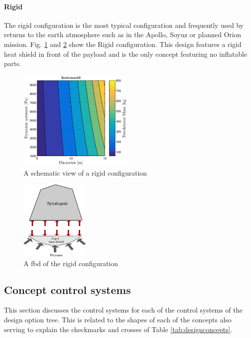 \paragraph{Rigid}

The rigid configuration is the most typical configuration and frequently used by returns to the earth atmosphere such as in the Apollo, Soyuz or planned Orion mission. Fig. \ref{fig:conc_rigid} and \ref{fig:fbd_rigid} show the Rigid configuration. This design features a rigid heat shield in front of the payload and is the only concept featuring no inflatable parts.

\begin{figure}[H]
\centering
\includegraphics[width = 0.5\textwidth]{Figure/ISO_comp.eps}
\caption{A schematic view of a rigid configuration}
\label{fig:conc_rigid}
\end{figure}

\begin{figure}[H]
\centering
\includegraphics[width = 0.3\textwidth]{Figure/FBD_rigid.eps}
\caption{A \gls{fbd} of the rigid configuration}
\label{fig:fbd_rigid}
\end{figure}

\subsection{Concept control systems} \label{sec:ccs}
This section discusses the control systems for each of the control systems of the design option tree. This is related to the shapes of each of the concepts also serving to explain the checkmarks and crosses of Table \ref{tab:designconcepts}. 


